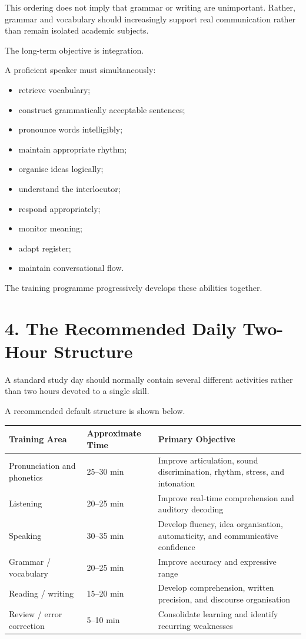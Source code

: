 This ordering does not imply that grammar or writing are unimportant. Rather, grammar and vocabulary should increasingly support real communication rather than remain isolated academic subjects.

The long-term objective is integration.

A proficient speaker must simultaneously:

\begin{itemize}
    \item retrieve vocabulary;
    \item construct grammatically acceptable sentences;
    \item pronounce words intelligibly;
    \item maintain appropriate rhythm;
    \item organise ideas logically;
    \item understand the interlocutor;
    \item respond appropriately;
    \item monitor meaning;
    \item adapt register;
    \item maintain conversational flow.
\end{itemize}

The training programme progressively develops these abilities together.

\section*{4. The Recommended Daily Two-Hour Structure}

A standard study day should normally contain several different activities rather than two hours devoted to a single skill.

A recommended default structure is shown below.

\begin{table}[htbp]
\centering
\begin{tabular}{|p{4cm}|p{3cm}|p{7cm}|}
\hline
\textbf{Training Area} & \textbf{Approximate Time} & \textbf{Primary Objective} \\
\hline
Pronunciation and phonetics & 25--30 min & Improve articulation, sound discrimination, rhythm, stress, and intonation \\
\hline
Listening & 20--25 min & Improve real-time comprehension and auditory decoding \\
\hline
Speaking & 30--35 min & Develop fluency, idea organisation, automaticity, and communicative confidence \\
\hline
Grammar / vocabulary & 20--25 min & Improve accuracy and expressive range \\
\hline
Reading / writing & 15--20 min & Develop comprehension, written precision, and discourse organisation \\
\hline
Review / error correction & 5--10 min & Consolidate learning and identify recurring weaknesses \\
\hline
\end{tabular}
\end{table}

